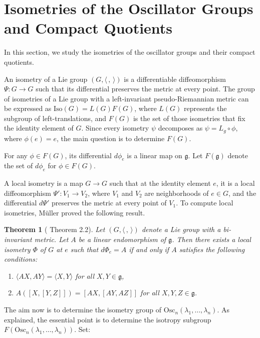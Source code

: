 \documentclass[12pt]{amsart}
\theoremstyle{plain}
\newtheorem{thm}{Theorem}[section]
\theoremstyle{definition}
\theoremstyle{remark}
\begin{document}
	
	
	
	
\section{Isometries of the Oscillator Groups and Compact Quotients}
In this section, we study the isometries of the oscillator groups and their compact quotients.

An isometry of a Lie group \( (G, \langle \,,\, \rangle) \) is a differentiable diffeomorphism \( \Psi: G \to G \) such that its differential preserves the metric at every point. The group of isometries of a Lie group with a left-invariant pseudo-Riemannian metric can be expressed as \( \text{Iso}(G) = L(G)F(G) \), where \( L(G) \) represents the subgroup of left-translations, and \( F(G) \) is the set of those isometries that fix the identity element of \( G \). Since every isometry \( \psi \) decomposes as \( \psi = L_g \circ \phi \), where \( \phi(e) = e \), the main question is to determine \( F(G) \).

For any \( \phi \in F(G) \), its differential \( d\phi_e \) is a linear map on \( \mathfrak{g} \). Let \( F(\mathfrak{g}) \) denote the set of \( d\phi_e \) for \( \phi \in F(G) \).

A local isometry is a map \( G \to G \) such that at the identity element \( e \), it is a local diffeomorphism \( \Psi': V_1 \to V_2 \), where \( V_1 \) and \( V_2 \) are neighborhoods of \( e \in G \), and the differential \( d\Psi' \) preserves the metric at every point of \( V_1 \). To compute local isometries, Müller proved the following result.

\begin{thm}[\cite{MU} Theorem 2.2] 
    Let \( (G, \langle \,,\, \rangle) \) denote a Lie group with a bi-invariant metric. Let \( A \) be a linear endomorphism of \( \mathfrak{g} \). Then there exists a local isometry \( \Phi \) of \( G \) at \( e \) such that \( d\Phi_e = A \) if and only if \( A \) satisfies the following conditions:
    \begin{enumerate}
        \item \( \langle AX, AY \rangle = \langle X, Y \rangle \) for all \( X, Y \in \mathfrak{g} \),
        \item \( A([X,[Y,Z]]) = [AX,[AY,AZ]] \) for all \( X, Y, Z \in \mathfrak{g} \).
    \end{enumerate}
\end{thm}

The aim now is to determine the isometry group of \( \text{Osc}_n(\lambda_1, \ldots, \lambda_n) \). As explained, the essential point is to determine the isotropy subgroup \( F(\text{Osc}_n(\lambda_1, \ldots, \lambda_n)) \). Set:
\end{document}
